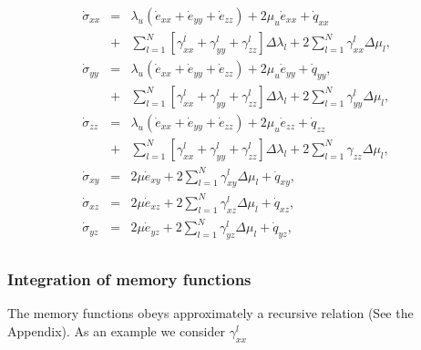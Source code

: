 \documentclass[11pt]{article}
\begin{document}
\begin{eqnarray}
  \dot{\sigma}_{xx} 
    & = & \lambda_u \left (\dot{e}_{xx} + \dot{e}_{yy} + \dot{e}_{zz}\right)
         + 2\mu_u \dot{e}_{xx} +\dot{q}_{xx}                 \nonumber\\
    & + & \sum_{l=1}^N\left[\gamma^l_{xx}+\gamma^l_{yy}
                           +\gamma^l_{zz}\right]\Delta\lambda_l
         + 2\sum_{l=1}^N\gamma^l_{xx}\Delta\mu_l,            \nonumber\\
  \dot{\sigma}_{yy} 
    & = & \lambda_u 
         \left (\dot{e}_{xx} + \dot{e}_{yy} + \dot{e}_{zz}\right)
         + 2\mu_u \dot{e}_{yy} +\dot{q}_{yy},                     \nonumber\\
    & + & \sum_{l=1}^N\left[\gamma^l_{xx}+\gamma^l_{yy} +
                             \gamma^l_{zz}\right] \Delta\lambda_l  
         + 2\sum_{l=1}^N\gamma^l_{yy}\Delta\mu_l,                 \nonumber\\
  \dot{\sigma}_{zz} 
    & = & \lambda_u \left (\dot{e}_{xx} + \dot{e}_{yy} 
         + \dot{e}_{zz}\right)+ 2\mu_u \dot{e}_{zz} +\dot{q}_{zz} \nonumber\\
    & + & \sum_{l=1}^N\left[\gamma^l_{xx}+\gamma^l_{yy}
                           +\gamma^l_{zz}\right]\Delta\lambda_l  
         + 2\sum_{l=1}^N\gamma_{zz}\Delta\mu_l,                   \nonumber\\
  \dot{\sigma}_{xy} 
    & = & 2\mu \dot{e}_{xy} + 2\sum_{l=1}^N\gamma^l_{xy}
          \Delta\mu_l+\dot{q}_{xy}                                \nonumber,\\
  \dot{\sigma}_{xz} 
    & = & 2\mu \dot{e}_{xz} + 2\sum_{l=1}^N\gamma^l_{xz}
          \Delta\mu_l+\dot{q}_{xz}                                \nonumber,\\
  \dot{\sigma}_{yz} 
    & = & 2\mu \dot{e}_{yz} + 2\sum_{l=1}^N\gamma^l_{yz}
          \Delta\mu_l+\dot{q}_{yz}                                \nonumber,\\
                 \label{eq:visco-el}
\end{eqnarray} 


\subsubsection{Integration of memory functions}
The memory functions  obeys approximately a recursive relation (See the
Appendix). As an example we consider $\gamma^l_{xx}$
\end{document}
